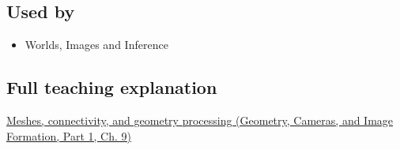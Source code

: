 \subsection{Used by}\label{appendix-1dd4ad54ca57-used-by}

\hypertarget{appendix-1dd4ad54ca57-used-by}{}

\begin{itemize}
\tightlist
\item
  {Worlds, Images and Inference}
\end{itemize}

\subsection{Full teaching explanation}\label{appendix-1dd4ad54ca57-full-teaching-explanation}

\hypertarget{appendix-1dd4ad54ca57-full-teaching-explanation}{}

\href{../03-Geometry-Cameras-and-Image-Formation-P01/main.pdf\#03-visual-computing-i-ch002-meshes-connectivity-and-geometry-processing}{Meshes, connectivity, and geometry processing (Geometry, Cameras, and Image Formation, Part 1, Ch. 9)}
